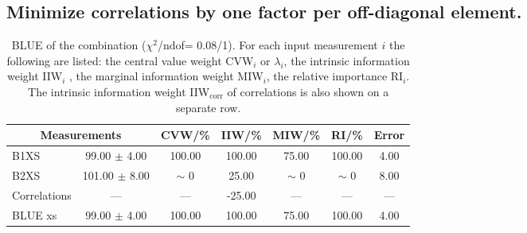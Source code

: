 \subsection{Minimize correlations by one factor per off-diagonal element.}
\begin{table}[H]
\scriptsize
\begin{center}
\renewcommand{\arraystretch}{1.1}
\begin{tabular}{|lc|c|c|c|c|c|}
\hline
\multicolumn{2}{|c|}{Measurements} & CVW/\%  & IIW/\%  & MIW/\%  & RI/\%  & {\tiny Error}\\
\hline
B1XS &      99.00 $\pm$       4.00 &     100.00 &     100.00 &      75.00 &     100.00 &       4.00\\
B2XS &     101.00 $\pm$       8.00 &  {\tiny $\sim$ }0 &      25.00 &  {\tiny $\sim$ }0 &  {\tiny $\sim$ }0 &       8.00\\
Correlations & --- & --- &     -25.00 & --- & --- & ---\\
\hline
BLUE {\tiny xs} &      99.00 $\pm$       4.00 &     100.00 &     100.00 &      75.00 &     100.00 &       4.00\\
\hline
\end{tabular}
\caption{BLUE of the combination ($\chi^2$/ndof=      0.08/1).
 For each input measurement $i$ the following are listed: the central value weight CVW$_i$ or $\lambda_i$, the intrinsic information weight IIW$_i$ , the marginal information weight MIW$_i$, the relative importance RI$_i$. The intrinsic information weight IIW$_{\mathrm{corr}}$ of correlations is also shown on a separate row.}
\renewcommand{\arraystretch}{1}
\end{center}
\end{table}
